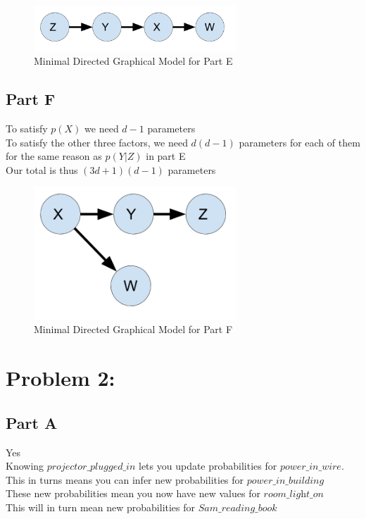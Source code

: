 \documentclass[twoside,11pt]{article}
\theoremstyle{definition}
\begin{document}
\begin{figure}[h]
\centering
\includegraphics[width=3in]{HW1_Prob1_partE.png}
\caption{Minimal Directed Graphical Model for Part E}
\end{figure}

\subsection*{Part F}

To satisfy $p(X)$ we need $d-1$ parameters\\
To satisfy the other three factors, we need $d(d-1)$ parameters for each of them for the same reason as $p(Y|Z)$ in part E\\
Our total is thus $(3d+1)(d-1)$ parameters

\begin{figure}[h]
\centering
\includegraphics[width=3in]{HW1_Prob1_partF.png}
\caption{Minimal Directed Graphical Model for Part F}
\end{figure}

\newpage

\section*{Problem 2:}

\subsection*{Part A}
Yes\\
Knowing $\textit{projector\_plugged\_in}$ lets you update probabilities for $\textit{power\_in\_wire}$.\\
This in turns means you can infer new probabilities for $\textit{power\_in\_building}$\\
These new probabilities mean you now have new values for  $\textit{room\_light\_on}$\\
This will in turn mean new probabilities for $\textit{Sam\_reading\_book}$
\end{document}
